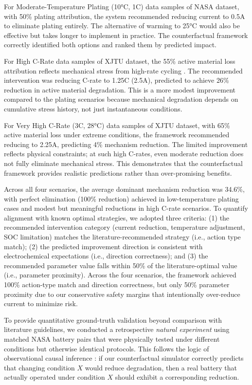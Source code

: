 \documentclass[5p,times,authoryear]{elsarticle}
\begin{document}
For Moderate-Temperature Plating (10°C, 1C) data samples of NASA dataset, with 50\% plating attribution, the system recommended reducing current to 0.5A to eliminate plating entirely. The alternative of warming to 25°C would also be effective but takes longer to implement in practice. The counterfactual framework correctly identified both options and ranked them by predicted impact.

For High C-Rate data samples of XJTU dataset, the 55\% active material loss attribution reflects mechanical stress from high-rate cycling \citep{birkl2017degradation}. The recommended intervention was reducing C-rate to 1.25C (2.5A), predicted to achieve 26\% reduction in active material degradation. This is a more modest improvement compared to the plating scenarios because mechanical degradation depends on cumulative stress history, not just instantaneous conditions.

For Very High C-Rate (3C, 28°C) data samples of XJTU dataset, with 65\% active material loss under extreme conditions, the framework recommended reducing to 2.25A, predicting 4\% mechanism reduction. The limited improvement reflects physical constraints; at such high C-rates, even moderate reduction does not fully eliminate mechanical stress. This demonstrates that the counterfactual framework provides realistic predictions rather than over-promising benefits.

Across all four scenarios, the average dominant mechanism reduction was 34.6\%, with perfect elimination (100\% reduction) achieved in low-temperature plating cases and modest but meaningful reductions in high C-rate scenarios. To quantify alignment with known optimal strategies, we adopted three criteria: (1) the recommended intervention category (current reduction, temperature adjustment, SOC limitation) matches the literature-recommended strategy (i.e., action type match); (2) the predicted improvement direction is consistent with electrochemical expectations (i.e., direction correctness); and (3) the recommended parameter value falls within 50\% of the literature-optimal value (i.e., parameter proximity). Across the four scenarios, the framework achieved 100\% action-type match and direction correctness, but only 50\% parameter proximity due to our conservative safety margins that intentionally over-reduce current to minimize risk.

To provide quantitative ground-truth validation beyond comparison with literature guidelines, we conducted a retrospective \textit{natural experiment} using matched NASA battery pairs that were physically tested under different conditions but otherwise identical protocols. This follows the logic of observational causal inference \citep{pearl2009causality}: if our counterfactual simulator correctly predicts that changing condition $X$ would reduce degradation, then a real battery that actually operated under condition $X$ should exhibit a corresponding reduction.
\end{document}
